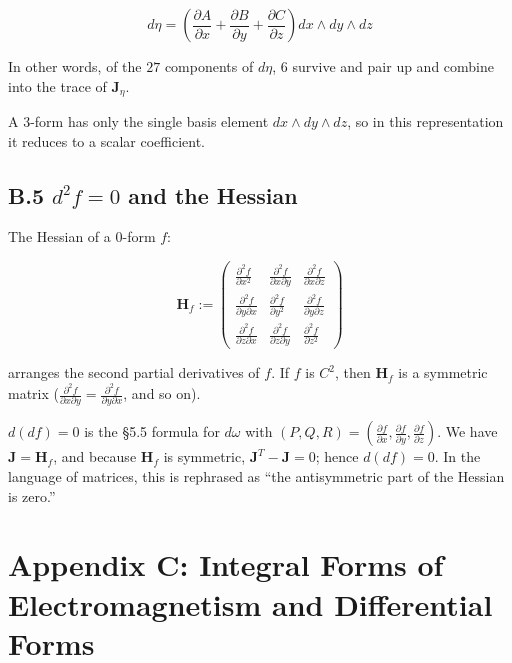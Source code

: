 \documentclass[a4paper,12pt,openany]{book}
\begin{document}
\[d\eta = \left( \frac{\partial A}{\partial x} + \frac{\partial B}{\partial y} + \frac{\partial C}{\partial z} \right) dx \wedge dy \wedge dz\]

In other words, of the \(27\) components of \(d\eta\), \(6\) survive and
pair up and combine into the trace of \(\mathbf{J}_\eta\).

A \(3\)-form has only the single basis element
\(dx \wedge dy \wedge dz\), so in this representation it reduces to a
scalar coefficient.

\hypertarget{b.5-d2-f-0-and-the-hessian}{%
\subsection*{\texorpdfstring{B.5 \(d^2 f = 0\) and the
Hessian}{B.5 d\^{}2 f = 0 and the Hessian}}\label{b.5-d2-f-0-and-the-hessian}}

The Hessian of a \(0\)-form \(f\):

\[\mathbf{H}_f := \begin{pmatrix}
\frac{\partial^2 f}{\partial x^2} & \frac{\partial^2 f}{\partial x \partial y} & \frac{\partial^2 f}{\partial x \partial z} \\
\frac{\partial^2 f}{\partial y \partial x} & \frac{\partial^2 f}{\partial y^2} & \frac{\partial^2 f}{\partial y \partial z} \\
\frac{\partial^2 f}{\partial z \partial x} & \frac{\partial^2 f}{\partial z \partial y} & \frac{\partial^2 f}{\partial z^2}
\end{pmatrix}\]

arranges the second partial derivatives of \(f\). If \(f\) is \(C^2\),
then \(\mathbf{H}_f\) is a symmetric matrix
(\(\frac{\partial^2 f}{\partial x \partial y} = \frac{\partial^2 f}{\partial y \partial x}\),
and so on).

\(d(df) = 0\) is the §5.5 formula for \(d\omega\) with
\((P,Q,R) = (\frac{\partial f}{\partial x}, \frac{\partial f}{\partial y}, \frac{\partial f}{\partial z})\).
We have \(\mathbf{J} = \mathbf{H}_f\), and because \(\mathbf{H}_f\) is
symmetric, \(\mathbf{J}^T - \mathbf{J} = 0\); hence \(d(df) = 0\). In
the language of matrices, this is rephrased as ``the antisymmetric part
of the Hessian is zero.''

\hypertarget{appendix-c-integral-forms-of-electromagnetism-and-differential-forms}{%
\section{Appendix C: Integral Forms of Electromagnetism and Differential
Forms}\label{appendix-c-integral-forms-of-electromagnetism-and-differential-forms}}
\end{document}
